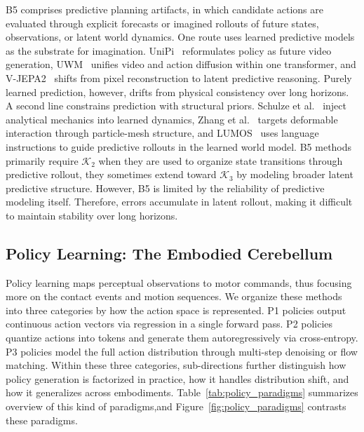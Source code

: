 \documentclass[acmsmall,screen,review]{acmart}
\begin{document}
B5 comprises predictive planning artifacts, in which candidate actions are evaluated through explicit forecasts or imagined rollouts of future states, observations, or latent world dynamics. 
One route uses learned predictive models as the substrate for imagination. 
UniPi~\cite{du2023unipi} reformulates policy as future video generation, UWM~\cite{zhu2025uwm} unifies video and action diffusion within one transformer, and V-JEPA2~\cite{assran2025vjepa} shifts from pixel reconstruction to latent predictive reasoning. 
Purely learned prediction, however, drifts from physical consistency over long horizons. 
A second line constrains prediction with structural priors. Schulze et al.~\cite{schulze2025lagrangian} inject analytical mechanics into learned dynamics, Zhang et al.~\cite{zhang2025particlegrid} targets deformable interaction through particle-mesh structure, and LUMOS~\cite{nematollahi2025lumos} uses language instructions to guide predictive rollouts in the learned world model.
B5 methods primarily require \(\mathcal{K}_2\) when they are used to organize state transitions through predictive rollout, they sometimes extend toward \(\mathcal{K}_3\) by modeling broader latent predictive structure. 
However, B5 is limited by the reliability of predictive modeling itself. 
Therefore, errors accumulate in latent rollout, making it difficult to maintain stability over long horizons.

\subsection{Policy Learning: The Embodied Cerebellum}\label{sec:policy_learning_low_level}

Policy learning maps perceptual observations to motor commands, thus focusing more on the contact events and motion sequences. 
We organize these methods into three categories by how the action space is represented. 
P1 policies output continuous action vectors via regression in a single forward pass.
P2 policies quantize actions into tokens and generate them autoregressively via cross-entropy. 
P3 policies model the full action distribution through multi-step denoising or flow matching. 
Within these three categories, sub-directions further distinguish how policy generation is factorized in practice, how it handles distribution shift, and how it generalizes across embodiments.
Table~\ref{tab:policy_paradigms} summarizes overview of this kind of paradigms,and Figure~\ref{fig:policy_paradigms} contrasts these paradigms.
\end{document}
